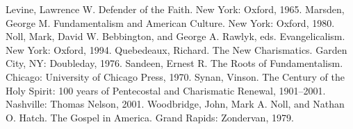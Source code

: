 \begin{readinglist}
\entry Levine, Lawrence W. Defender of the Faith. New York: Oxford, 1965.
\entry Marsden, George M. Fundamentalism and American Culture. New York: Oxford, 1980.
\entry Noll, Mark, David W. Bebbington, and George A. Rawlyk, eds. Evangelicalism. New York: Oxford,
  1994.
\entry Quebedeaux, Richard. The New Charismatics. Garden City, NY: Doubleday, 1976.
\entry Sandeen, Ernest R. The Roots of Fundamentalism. Chicago: University of Chicago Press, 1970.
\entry *Synan, Vinson. The Century of the Holy Spirit: 100 years of Pentecostal and Charismatic
  Renewal, 1901–2001. Nashville: Thomas Nelson, 2001.
\entry Woodbridge, John, Mark A. Noll, and Nathan O. Hatch. The Gospel in America. Grand Rapids:
  Zondervan, 1979.
\end{readinglist}
